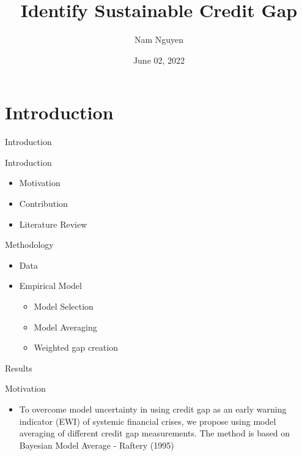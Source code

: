 \documentclass[
  ignorenonframetext,
]{beamer}
\title{Identify Sustainable Credit Gap}
\author{Nam Nguyen}
\date{June 02, 2022}
\institute{UWM}
\providecommand{\tightlist}{%
  \setlength{\itemsep}{0pt}\setlength{\parskip}{0pt}}
\begin{document}
\frame{\titlepage}

\hypertarget{introduction}{%
\section{Introduction}\label{introduction}}

\begin{frame}{Introduction}
\begin{block}{Introduction}
\protect\hypertarget{introduction-1}{}
\begin{itemize}
\tightlist
\item
  Motivation
\item
  Contribution
\item
  Literature Review
\end{itemize}
\end{block}

\begin{block}{Methodology}
\protect\hypertarget{methodology}{}
\begin{itemize}
\tightlist
\item
  Data
\item
  Empirical Model

  \begin{itemize}
  \tightlist
  \item
    Model Selection
  \item
    Model Averaging
  \item
    Weighted gap creation
  \end{itemize}
\end{itemize}
\end{block}

\begin{block}{Results}
\protect\hypertarget{results}{}
\end{block}
\end{frame}

\begin{frame}{Motivation}
\protect\hypertarget{motivation}{}
\begin{itemize}
\tightlist
\item
  To overcome model uncertainty in using credit gap as an early warning
  indicator (EWI) of systemic financial crises, we propose using model
  averaging of different credit gap measurements. The method is based on
  Bayesian Model Average - Raftery (1995)
\end{itemize}
\end{frame}
\end{document}
